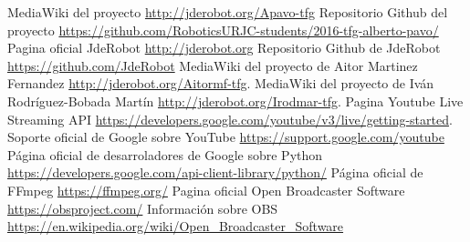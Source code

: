 \begin{thebibliography}{X}

 MediaWiki del proyecto \url{http://jderobot.org/Apavo-tfg}
 Repositorio Github del proyecto \url{https://github.com/RoboticsURJC-students/2016-tfg-alberto-pavo/}
 Pagina oficial JdeRobot \url{http://jderobot.org}
 Repositorio Github de JdeRobot \url{https://github.com/JdeRobot}
 MediaWiki del proyecto de Aitor Martinez Fernandez \url{http://jderobot.org/Aitormf-tfg}.
 MediaWiki del proyecto de Iván Rodríguez-Bobada Martín \url{http://jderobot.org/Irodmar-tfg}.
 Pagina Youtube Live Streaming API \url{https://developers.google.com/youtube/v3/live/getting-started}.
 Soporte oficial de Google sobre YouTube \url{https://support.google.com/youtube}
 Página oficial de desarroladores de Google sobre Python \url{https://developers.google.com/api-client-library/python/}
 Página oficial de FFmpeg \url{https://ffmpeg.org/}
 Pagina oficial Open Broadcaster Software \url{https://obsproject.com/}
 Información sobre OBS \url{https://en.wikipedia.org/wiki/Open_Broadcaster_Software}

\end{thebibliography}